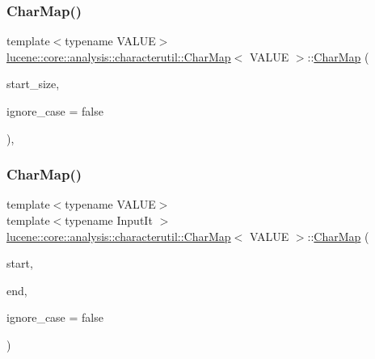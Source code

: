 \mbox{\label{classlucene_1_1core_1_1analysis_1_1characterutil_1_1CharMap_a797c76287d00853e737c8fcd8006769d}} 
\subsubsection{\texorpdfstring{Char\+Map()}{CharMap()}\hspace{0.1cm}{\footnotesize\ttfamily [2/5]}}
{\footnotesize\ttfamily template$<$typename V\+A\+L\+UE$>$ \\
\mbox{\hyperlink{classlucene_1_1core_1_1analysis_1_1characterutil_1_1CharMap}{lucene\+::core\+::analysis\+::characterutil\+::\+Char\+Map}}$<$ V\+A\+L\+UE $>$\+::\mbox{\hyperlink{classlucene_1_1core_1_1analysis_1_1characterutil_1_1CharMap}{Char\+Map}} (\begin{DoxyParamCaption}\item[{const uint32\+\_\+t}]{start\+\_\+size,  }\item[{const bool}]{ignore\+\_\+case = {\ttfamily false} }\end{DoxyParamCaption})\hspace{0.3cm}{\ttfamily [inline]}, {\ttfamily [explicit]}}

\mbox{\label{classlucene_1_1core_1_1analysis_1_1characterutil_1_1CharMap_a7449492bf51315ef11481821b113c0f1}} 
\subsubsection{\texorpdfstring{Char\+Map()}{CharMap()}\hspace{0.1cm}{\footnotesize\ttfamily [3/5]}}
{\footnotesize\ttfamily template$<$typename V\+A\+L\+UE$>$ \\
template$<$typename Input\+It $>$ \\
\mbox{\hyperlink{classlucene_1_1core_1_1analysis_1_1characterutil_1_1CharMap}{lucene\+::core\+::analysis\+::characterutil\+::\+Char\+Map}}$<$ V\+A\+L\+UE $>$\+::\mbox{\hyperlink{classlucene_1_1core_1_1analysis_1_1characterutil_1_1CharMap}{Char\+Map}} (\begin{DoxyParamCaption}\item[{Input\+It}]{start,  }\item[{Input\+It}]{end,  }\item[{const bool}]{ignore\+\_\+case = {\ttfamily false} }\end{DoxyParamCaption})\hspace{0.3cm}{\ttfamily [inline]}}

